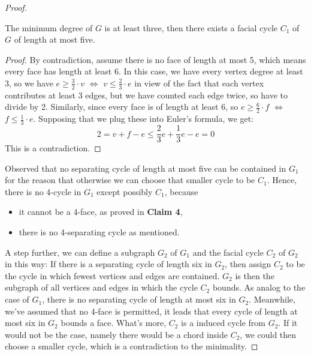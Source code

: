\begin{proof}
\begin{lemma}
The minimum degree of $G$ is at least three, then there exists a facial cycle $C_1$ of $G$ of length at most five.
\end{lemma}

\begin{proof}
By contradiction, assume there is no face of length at
most 5, which means every face has length at least 6. In this case, we have every vertex degree at least 3, so we have $e \geq \frac{3}{2} \cdot v$ $\Longleftrightarrow$ $v \leq \frac{2}{3} \cdot e$ in view of the fact that each vertex contributes at least 3 edges, but we have counted each edge twice, so have to divide by 2. Similarly, since every face is of length at least 6, so $e \geq \frac{6}{2} \cdot f$ $\Longleftrightarrow$ $f \leq \frac{1}{3} \cdot e$. Supposing that we plug these into Euler's formula, we get:
\begin{equation*}
    2 = v + f - e \leq \frac{2}{3}e + \frac{1}{3}e - e = 0
\end{equation*}
This is a contradiction.
\end{proof}

Observed that no separating cycle of length at most five can be contained in $G_1$ for the reason that otherwise we can choose that smaller cycle to be $C_1$. Hence, there is no 4-cycle in $G_1$ except possibly $C_1$, because 
\begin{itemize}
    \item it cannot be a 4-face, as proved in \textbf{Claim 4},
    \item there is no 4-separating cycle as mentioned.
\end{itemize}
A step further, we can define a subgraph $G_2$ of $G_1$ and the facial cycle $C_2$ of $G_2$ in this way: If there is a separating cycle of length six in $G_2$, then assign $C_2$ to be the cycle in which fewest vertices and edges are contained. $G_2$ is then the subgraph of all vertices and edges in which the cycle $C_2$ bounds. As analog to the case of $G_1$, there is no separating cycle of length at most six in $G_2$. Meanwhile, we've assumed that no 4-face is permitted, it leads that every cycle of length at most six in $G_2$ bounds a face. What's more, $C_2$ is a induced cycle from $G_2$. If it would not be the case, namely there would be a chord inside $C_2$, we could then choose a smaller cycle, which is a contradiction to the minimality. 


\end{proof}
